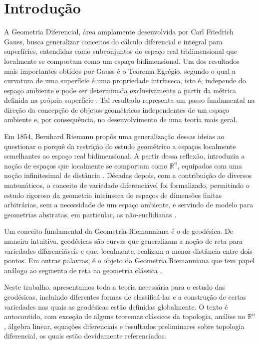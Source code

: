 
\chapter{Introdução}
\label{chap:introducao}

A Geometria Diferencial, área amplamente desenvolvida por Carl Friedrich Gauss, busca generalizar conceitos do cálculo diferencial e integral para superfícies, entendidas como subconjuntos do espaço real tridimensional que localmente se comportam como um espaço bidimensional. Um dos resultados mais importantes obtidos por Gauss é o Teorema Egrégio, segundo o qual a curvatura de uma superfície é uma propriedade intrínseca, isto é, independe do espaço ambiente e pode ser determinada exclusivamente a partir da métrica definida na própria superfície \cite{gauss1902}. Tal resultado representa um passo fundamental na direção da concepção de objetos geométricos independentes de um espaço ambiente e, por consequência, no desenvolvimento de uma teoria mais geral.

Em 1854, Bernhard Riemann propôs uma generalização dessas ideias ao questionar o porquê da restrição do estudo geométrico a espaços localmente semelhantes ao espaço real bidimensional. A partir dessa reflexão, introduziu a noção de espaços que localmente se comportam como $\mathbb{R}^{n}$, equipados com uma noção infinitesimal de distância \cite{riemann1873}. Décadas depois, com a contribuição de diversos matemáticos, o conceito de variedade diferenciável foi formalizado, permitindo o estudo rigoroso da geometria intrínseca de espaços de dimensões finitas arbitrárias, sem a necessidade de um espaço ambiente, e servindo de modelo para geometrias abstratas, em particular, as não-euclidianas \cite{lima1960variedades}.

Um conceito fundamental da Geometria Riemanniana é o de geodésica. De maneira intuitiva, geodésicas são curvas que generalizam a noção de reta para variedades diferenciáveis e que, localmente, realizam a menor distância entre dois pontos. Em outras palavras, é o objeto da Geometria Riemanniana que tem papel análogo ao segmento de reta na geometria clássica \cite{doCarmo1992}.

Neste trabalho, apresentamos toda a teoria necessária para o estudo das geodésicas, incluindo diferentes formas de classificá-las e a construção de certas variedades nas quais as geodésicas estão definidas globalmente. O texto é autocontido, com exceção de alguns teoremas clássicos da topologia, análise no $\mathbb{R}^{n}$, álgebra linear, equações diferenciais e resultados preliminares sobre topologia diferencial, os quais estão devidamente referenciados.

